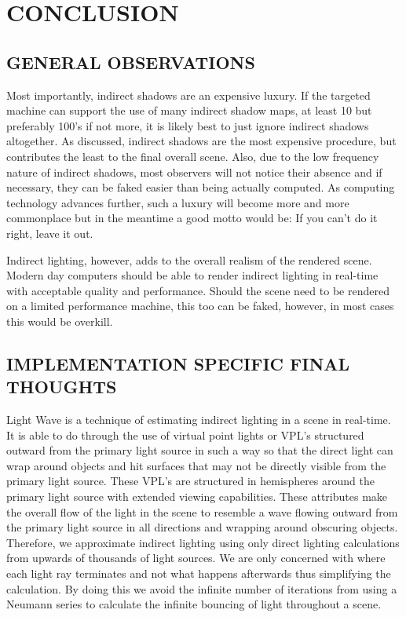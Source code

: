 \chapter{CONCLUSION}

\section{GENERAL OBSERVATIONS}
Most importantly, indirect shadows are an expensive luxury.  If the targeted machine can support the use of many indirect shadow maps, at least 10 but preferably 100's if not more, it is likely best to just ignore indirect shadows altogether.  As discussed, indirect shadows are the most expensive procedure, but contributes the least to the final overall scene.  Also, due to the low frequency nature of indirect shadows, most observers will not notice their absence and if necessary, they can be faked easier than being actually computed.  As computing technology advances further, such a luxury will become more and more commonplace but in the meantime a good motto would be: If you can't do it right, leave it out.

Indirect lighting, however, adds to the overall realism of the rendered scene.  Modern day computers should be able to render indirect lighting in real-time with acceptable quality and performance.  Should the scene need to be rendered on a limited performance machine, this too can be faked, however, in most cases this would be overkill.

\section{IMPLEMENTATION SPECIFIC FINAL THOUGHTS}
Light Wave is a technique of estimating indirect lighting in a scene in real-time.  It is able to do through the use of virtual point lights or VPL's structured outward from the primary light source in such a way so that the direct light can wrap around objects and hit surfaces that may not be directly visible from the primary light source.  These VPL's are structured in hemispheres around the primary light source with extended viewing capabilities.  These attributes make the overall flow of the light in the scene to resemble a wave flowing outward from the primary light source in all directions and wrapping around obscuring objects.  Therefore, we approximate indirect lighting using only direct lighting calculations from upwards of thousands of light sources.  We are only concerned with where each light ray terminates and not what happens afterwards thus simplifying the calculation.  By doing this we avoid the infinite number of iterations from using a Neumann series to calculate the infinite bouncing of light throughout a scene.

